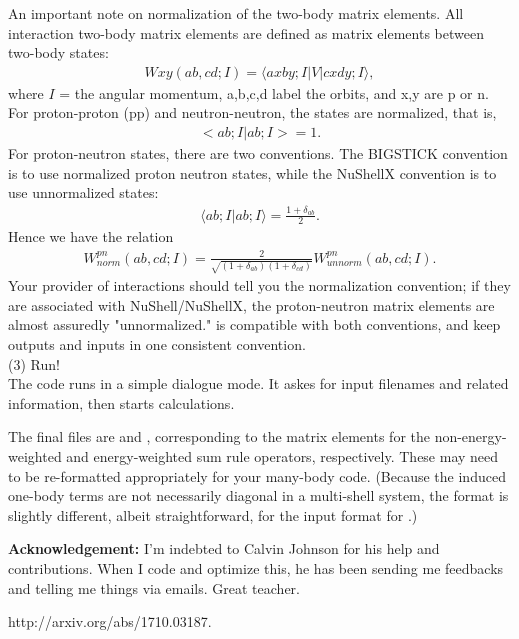 \documentclass{article}
\begin{document}
\begin{spacing}{1.5}
An important note on normalization of the two-body matrix elements. 
All interaction two-body matrix elements are defined as matrix elements between two-body states:
\begin{eqnarray}
Wxy(ab,cd;I) = \langle axby;I | V | cxdy;I \rangle,
\end{eqnarray}
where $I$ = the angular momentum, a,b,c,d label the orbits, and x,y are p or n. 
For proton-proton (pp) and neutron-neutron, the states are normalized, that is, 
\begin{eqnarray}
< ab;I | ab;I > = 1.
\end{eqnarray}
For proton-neutron states, there are two conventions. 
The BIGSTICK convention is to use normalized proton neutron states, while the NuShellX convention is to use unnormalized states: 
\begin{eqnarray}
\langle ab;I | ab;I \rangle = \frac{1+\delta_{ab}}{2}.
\end{eqnarray}
Hence we have the relation
\begin{eqnarray}
W^{pn}_{norm} (ab,cd;I) = \frac{2}{ \sqrt{(1+\delta_{ab})(1+\delta_{cd})}} W^{pn}_{unnorm}(ab,cd;I).
\end{eqnarray}
Your provider of interactions should tell you the normalization convention; if they are associated with NuShell/NuShellX, the proton-neutron matrix elements are almost assuredly "unnormalized."
 is compatible with both conventions, and keep outputs and inputs in one consistent convention.\\

(3) Run!\\

The code runs in a simple dialogue mode.
It askes for input filenames and related information, then starts calculations.

The final files are  and , corresponding to the matrix elements for the non-energy-weighted and energy-weighted sum rule operators, respectively. These may need to be re-formatted appropriately for your many-body code.  (Because the induced one-body terms are not necessarily diagonal in a multi-shell system, the format is slightly different, albeit straightforward, for the input format for .)
\end{spacing}

{\bf Acknowledgement:} 
I'm indebted to Calvin Johnson for his help and contributions.
When I code and optimize this, he has been sending me feedbacks and telling me things  via emails.
Great teacher.

\begin{thebibliography}{99}
 http://arxiv.org/abs/1710.03187.
\end{thebibliography}
\end{document}
